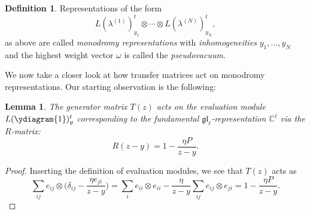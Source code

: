 \documentclass[11pt]{report}
\newtheorem{lemma}[theorem]{Lemma}
\theoremstyle{definition}
\newtheorem{definition}[theorem]{Definition}
\theoremstyle{remark}
\theoremstyle{remark}
\newcommand{\C}{\mathbb{C}}
\begin{document}
\begin{definition}
Representations of the form
\begin{equation*}
L(\lambda^{(1)})_{y_1}^t \otimes \cdots \otimes L(\lambda^{(N)})_{y_N}^t,
\end{equation*}
as above are called \emph{monodromy representations} with \emph{inhomogeneities} $y_1,...,y_N$ and the highest weight vector $\omega$ is called the \emph{pseudovacuum}. 
\end{definition}

We now take a closer look at how transfer matrices act on monodromy representations. Our starting observation is the following:

\begin{lemma}
The generator matrix $T(z)$ acts on the evaluation module $L(\ydiagram{1})_y^t$ corresponding to the fundamental $\mathfrak{gl}_\ell$-representation $\C^\ell$ via the $R$-matrix:
\begin{equation*}
R(z-y) = 1 - \frac{\eta P}{z-y}.
\end{equation*}
\end{lemma}

\begin{proof}
Inserting the definition of evaluation modules, we see that $T(z)$ acts as
\begin{equation*}
\sum_{ij} e_{ij} \otimes \bigg( \delta_{ij} - \frac{\eta e_{ji}}{z-y} \bigg)
= \sum_{i} e_{ii} \otimes e_{ii} - \frac{\eta}{z-y} \sum_{ij} e_{ij} \otimes e_{ji} = 1 - \frac{\eta P}{z-y}.
\end{equation*}
\end{proof}
\end{document}
